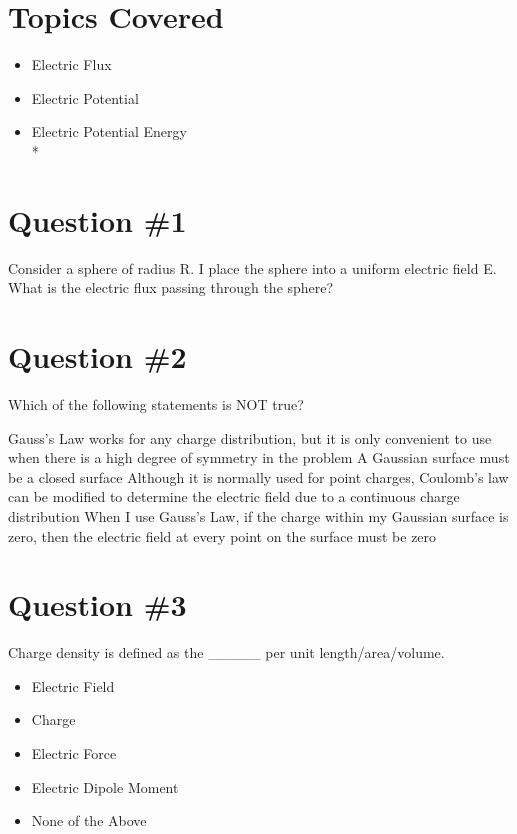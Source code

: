 \documentclass[12pt]{article}
\begin{document}
\maketitle

\section*{Topics Covered}
\begin{itemize}
\item Electric Flux
\item Electric Potential
\item Electric Potential Energy\\*
\end{itemize}

\section*{Question \#1}
Consider a sphere of radius R.  I place the sphere into a uniform electric field E.  What is the electric flux passing through the sphere?

\section*{Question \#2}
Which of the following statements is NOT true?

\begin{itemize}
 Gauss's Law works for any charge distribution, but it is only convenient to use when there is a high degree of symmetry in the problem
 A Gaussian surface must be a closed surface
 Although it is normally used for point charges, Coulomb's law can be modified to determine the electric field due to a continuous charge distribution
 When I use Gauss's Law, if the charge within my Gaussian surface is zero, then the electric field at every point on the surface must be zero
\end{itemize}

\section{Question \#3}
Charge density is defined as the _____ per unit length/area/volume.

\begin{itemize}
\item Electric Field
\item Charge
\item Electric Force
\item Electric Dipole Moment
\item None of the Above
\end{itemize}
\end{document}
